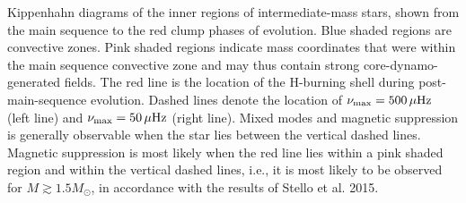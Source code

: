 \label{fig:DipoleHist}
Kippenhahn diagrams of the inner regions of intermediate-mass stars, shown from the main sequence to the red clump phases of evolution. Blue shaded regions are convective zones. Pink shaded regions indicate mass coordinates that were within the main sequence convective zone and may thus contain strong core-dynamo-generated fields. The red line is the location of the H-burning shell during post-main-sequence evolution. Dashed lines denote the location of $\nu_{\rm max} = 500 \, \mu{\rm Hz}$ (left line) and $\nu_{\rm max} = 50 \, \mu{\rm Hz}$ (right line). Mixed modes and magnetic suppression is generally observable when the star lies between the vertical dashed lines. Magnetic suppression is most likely when the red line lies within a pink shaded region and within the vertical dashed lines, i.e., it is most likely to be observed for $M \gtrsim 1.5 M_\odot$, in accordance with the results of Stello et al. 2015. 
